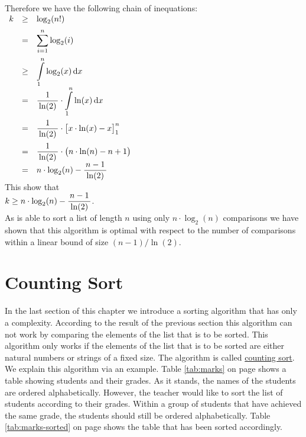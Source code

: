 Therefore we have the following chain of inequations:
\\[0.2cm]
\hspace*{1.3cm}
$
\begin{array}[t]{lcl}
  k & \geq & \displaystyle\log_2(n!) \\[0.2cm]
    & =    & \displaystyle\sum\limits_{i=1}^n \log_2(i) \\[0.5cm]
    & \geq & \displaystyle\int\limits_{1}^n \log_2(x)\, \mathrm{d}x \\[0.2cm]
    & =    & \displaystyle\frac{1}{\,\ln(2)\,} \cdot \int\limits_{1}^n \ln(x)\, \mathrm{d}x  \\[0.6cm]
    & =    & \displaystyle\frac{1}{\,\ln(2)\,} \cdot \bigl[x \cdot \ln(x) - x \bigr]_{1}^n   \\[0.4cm]
    & =    & \displaystyle\frac{1}{\,\ln(2)\,} \cdot \bigl(n \cdot \ln(n) - n + 1\bigr)     \\[0.2cm]
    & =    & \displaystyle n \cdot \log_2(n) - \frac{\,n-1\,}{\,\ln(2)\,}                       
\end{array}
$ 
\\[0.2cm]
This show that
\\[0.2cm]
\hspace*{1.3cm}
$k \geq n \cdot \displaystyle\log_2(n) - \frac{\,n-1\,}{\,\ln(2)\,}$.
\\[0.2cm]
As  is able to sort a list of length $n$ using only $n \cdot \log_2(n)$ comparisons
we have shown that this algorithm is optimal with respect to the number of comparisons within a linear bound of
size $(n-1)/\ln(2)$.




\section{Counting Sort}
In the last section of this chapter we introduce a sorting algorithm that has only a  complexity.
According to the result of the previous section this algorithm can not work by comparing the elements of the
list that is to be sorted.  This algorithm only works if the elements of the list that is to be sorted are
either natural numbers or strings of a fixed size.  The algorithm is called
\href{https://en.wikipedia.org/wiki/Counting_sort}{counting sort}. We 
explain this algorithm via an example.  Table \ref{tab:marks} on page \pageref{tab:marks} shows a table showing
students and their grades.  As it stands, the names of the students are ordered alphabetically.  However, the
teacher would like to sort the list of students according to their grades.  Within a group of students that
have achieved the same grade, the students should still be ordered alphabetically.  Table
\ref{tab:marks-sorted} on page \pageref{tab:marks-sorted} shows the table that has been sorted accordingly.

